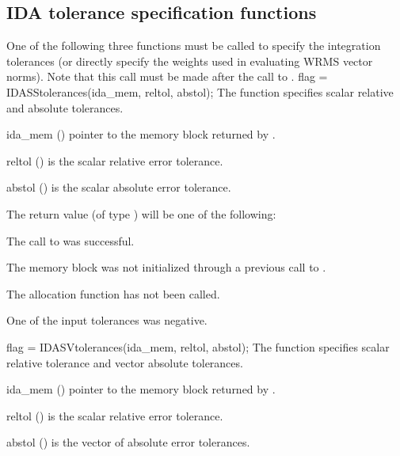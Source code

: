 \subsection{IDA tolerance specification functions}\label{sss:idatolerances}
One of the following three functions must be called to specify the
integration tolerances (or directly specify the weights used in
evaluating WRMS vector norms).  Note that this call must be made after
the call to .
{
  flag = IDASStolerances(ida\_mem, reltol, abstol);
}
{
  The function  specifies scalar relative and absolute
  tolerances.
}
{
  \begin{args}
  \item[ida\_mem] ()
    pointer to the {\ida} memory block returned by .
  \item[reltol] ()
    is the scalar relative error tolerance.
  \item[abstol] ()
    is the scalar absolute error tolerance.
  \end{args}
}
{
  The return value  (of type ) will be one of the following:
  \begin{args}
  \item[\Id{IDA\_SUCCESS}]
    The call to  was successful.
  \item[\Id{IDA\_MEM\_NULL}]
    The {\ida} memory block was not initialized through a previous call to
    .
  \item[\Id{IDA\_NO\_MALLOC}]
    The allocation function  has not been called.
  \item[\Id{IDA\_ILL\_INPUT}]
    One of the input tolerances was negative.
  \end{args}
}
{}
{
  flag = IDASVtolerances(ida\_mem, reltol, abstol);
}
{
  The function  specifies scalar relative tolerance and
  vector absolute tolerances.
}
{
  \begin{args}
  \item[ida\_mem] ()
    pointer to the {\ida} memory block returned by .
  \item[reltol] ()
    is the scalar relative error tolerance.
  \item[abstol] ()
    is the vector of absolute error tolerances.
  \end{args}
}
